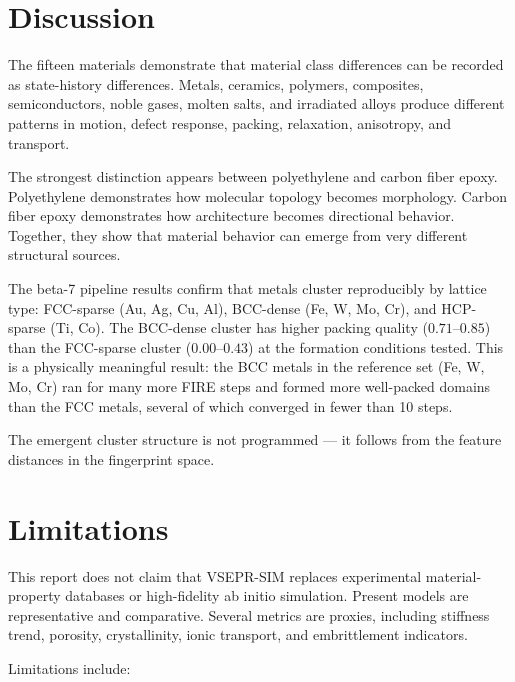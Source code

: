 \documentclass[12pt]{article}
\newcommand{\vsim}{\textsc{VSEPR-SIM}}
\begin{document}
\section{Discussion}

The fifteen materials demonstrate that material class differences can be recorded
as state-history differences.
Metals, ceramics, polymers, composites, semiconductors, noble gases, molten salts,
and irradiated alloys produce different patterns in motion, defect response,
packing, relaxation, anisotropy, and transport.

The strongest distinction appears between polyethylene and carbon fiber epoxy.
Polyethylene demonstrates how molecular topology becomes morphology.
Carbon fiber epoxy demonstrates how architecture becomes directional behavior.
Together, they show that material behavior can emerge from very different
structural sources.

The beta-7 pipeline results confirm that metals cluster reproducibly by
lattice type: FCC-sparse (Au, Ag, Cu, Al), BCC-dense (Fe, W, Mo, Cr),
and HCP-sparse (Ti, Co).
The BCC-dense cluster has higher packing quality ($0.71$--$0.85$) than the
FCC-sparse cluster ($0.00$--$0.43$) at the formation conditions tested.
This is a physically meaningful result: the BCC metals in the reference set
(Fe, W, Mo, Cr) ran for many more FIRE steps and formed more well-packed
domains than the FCC metals, several of which converged in fewer than
10 steps.

The emergent cluster structure is not programmed --- it follows from
the feature distances in the fingerprint space.

\section{Limitations}

This report does not claim that \vsim{} replaces experimental material-property
databases or high-fidelity ab initio simulation.
Present models are representative and comparative.
Several metrics are proxies, including stiffness trend, porosity, crystallinity,
ionic transport, and embrittlement indicators.

Limitations include:
\end{document}
